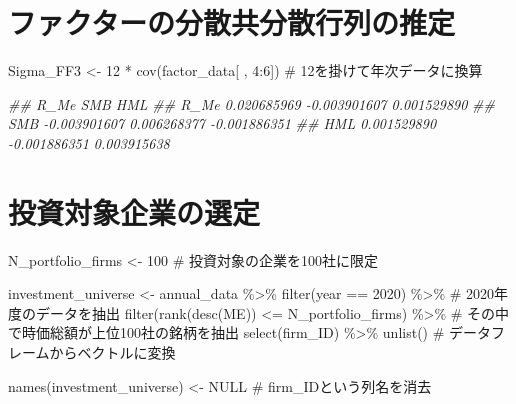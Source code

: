 \documentclass[
  letterpaper,
  DIV=11,
  numbers=noendperiod]{scrreprt}
\newenvironment{Shaded}{\begin{snugshade}}{\end{snugshade}}
\newcommand{\CommentTok}[1]{\textcolor[rgb]{0.37,0.37,0.37}{#1}}
\newcommand{\ConstantTok}[1]{\textcolor[rgb]{0.56,0.35,0.01}{#1}}
\newcommand{\DecValTok}[1]{\textcolor[rgb]{0.68,0.00,0.00}{#1}}
\newcommand{\DocumentationTok}[1]{\textcolor[rgb]{0.37,0.37,0.37}{\textit{#1}}}
\newcommand{\FunctionTok}[1]{\textcolor[rgb]{0.28,0.35,0.67}{#1}}
\newcommand{\NormalTok}[1]{\textcolor[rgb]{0.00,0.23,0.31}{#1}}
\newcommand{\OtherTok}[1]{\textcolor[rgb]{0.00,0.23,0.31}{#1}}
\newcommand{\SpecialCharTok}[1]{\textcolor[rgb]{0.37,0.37,0.37}{#1}}
\begin{document}
\section{ファクターの分散共分散行列の推定}\label{ux30d5ux30a1ux30afux30bfux30fcux306eux5206ux6563ux5171ux5206ux6563ux884cux5217ux306eux63a8ux5b9a}

\begin{Shaded}
\begin{Highlighting}[]
\NormalTok{Sigma\_FF3 }\OtherTok{\textless{}{-}} \DecValTok{12} \SpecialCharTok{*} \FunctionTok{cov}\NormalTok{(factor\_data[ , }\DecValTok{4}\SpecialCharTok{:}\DecValTok{6}\NormalTok{]) }\CommentTok{\# 12を掛けて年次データに換算}

\DocumentationTok{\#\#              R\_Me          SMB          HML}
\DocumentationTok{\#\# R\_Me  0.020685969 {-}0.003901607  0.001529890}
\DocumentationTok{\#\# SMB  {-}0.003901607  0.006268377 {-}0.001886351}
\DocumentationTok{\#\# HML   0.001529890 {-}0.001886351  0.003915638}
\end{Highlighting}
\end{Shaded}

\section{投資対象企業の選定}\label{ux6295ux8cc7ux5bfeux8c61ux4f01ux696dux306eux9078ux5b9a}

\begin{Shaded}
\begin{Highlighting}[]
\NormalTok{N\_portfolio\_firms }\OtherTok{\textless{}{-}} \DecValTok{100} \CommentTok{\# 投資対象の企業を100社に限定}

\NormalTok{investment\_universe }\OtherTok{\textless{}{-}}\NormalTok{  annual\_data }\SpecialCharTok{\%\textgreater{}\%} 
  \FunctionTok{filter}\NormalTok{(year }\SpecialCharTok{==} \DecValTok{2020}\NormalTok{) }\SpecialCharTok{\%\textgreater{}\%} \CommentTok{\# 2020年度のデータを抽出}
  \FunctionTok{filter}\NormalTok{(}\FunctionTok{rank}\NormalTok{(}\FunctionTok{desc}\NormalTok{(ME)) }\SpecialCharTok{\textless{}=}\NormalTok{ N\_portfolio\_firms) }\SpecialCharTok{\%\textgreater{}\%} \CommentTok{\# その中で時価総額が上位100社の銘柄を抽出}
  \FunctionTok{select}\NormalTok{(firm\_ID) }\SpecialCharTok{\%\textgreater{}\%} 
  \FunctionTok{unlist}\NormalTok{() }\CommentTok{\# データフレームからベクトルに変換}

\FunctionTok{names}\NormalTok{(investment\_universe) }\OtherTok{\textless{}{-}} \ConstantTok{NULL} \CommentTok{\# firm\_IDという列名を消去}
\end{Highlighting}
\end{Shaded}
\end{document}
